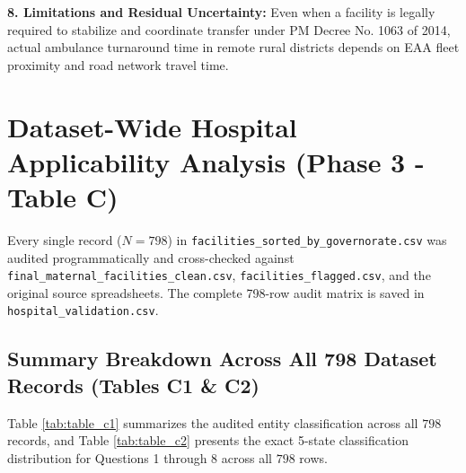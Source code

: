 \documentclass[10pt,a4paper]{article}
\begin{document}
\textbf{8. Limitations and Residual Uncertainty:}
Even when a facility is legally required to stabilize and coordinate transfer under PM Decree No. 1063 of 2014, actual ambulance turnaround time in remote rural districts depends on EAA fleet proximity and road network travel time.

\section{Dataset-Wide Hospital Applicability Analysis (Phase 3 - Table C)}

Every single record ($N = 798$) in \texttt{facilities\_sorted\_by\_governorate.csv} was audited programmatically and cross-checked against \texttt{final\_maternal\_facilities\_clean.csv}, \texttt{facilities\_flagged.csv}, and the original source spreadsheets. The complete 798-row audit matrix is saved in \texttt{hospital\_validation.csv}.

\subsection{Summary Breakdown Across All 798 Dataset Records (Tables C1 \& C2)}

Table \ref{tab:table_c1} summarizes the audited entity classification across all $798$ records, and Table \ref{tab:table_c2} presents the exact 5-state classification distribution for Questions 1 through 8 across all $798$ rows.
\end{document}
